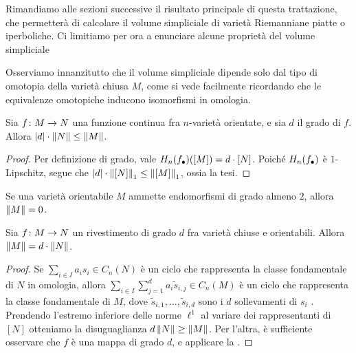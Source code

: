 Rimandiamo alle sezioni successive il risultato principale di questa trattazione, che permetterà di calcolare il volume simpliciale di varietà Riemanniane piatte o iperboliche. Ci limitiamo per ora a enunciare alcune proprietà del volume simpliciale

Osserviamo innanzitutto che il volume simpliciale dipende solo dal tipo di omotopia della varietà chiusa $M$, come si vede facilmente ricordando che le equivalenze omotopiche inducono isomorfismi in omologia.

\begin{proposition}
Sia $\map{f}{M}{N}$ una funzione continua fra $n$-varietà orientate, e sia $d$ il grado di $f$. Allora $|d|\cdot\left\lVert N\right\rVert\le\left\lVert M\right\rVert$.
\end{proposition}
\begin{proof}
Per definizione di grado, vale $H_n(f_\bullet)([M])=d\cdot[N]$. Poiché $H_n(f_\bullet)$ è $1$-Lipschitz, segue che $|d|\cdot\left\lVert [N]\right\rVert_1\le\left\lVert [M]\right\rVert_1$, ossia la tesi.
\end{proof}

\begin{corollary}
Se una varietà orientabile $M$ ammette endomorfismi di grado almeno $2$, allora $\left\lVert M\right\rVert=0$.
\end{corollary}

\begin{proposition}
Sia $\map{f}{M}{N}$ un rivestimento di grado $d$ fra varietà chiuse e orientabili. Allora $\left\lVert M\right\rVert=d\cdot\left\lVert N\right\rVert$. 
\end{proposition}
\begin{proof}
Se $\sum_{i\in I}a_is_i\in C_n(N)$ è un ciclo che rappresenta la classe fondamentale di $N$ in omologia, allora $\sum_{i\in I}\sum_{j=1}^da_i\widetilde{s}_{i,j}\in C_n(M)$ è un ciclo che rappresenta la classe fondamentale di $M$, dove $\widetilde{s}_{i,1},\ldots,\widetilde{s}_{i,d}$ sono i $d$ sollevamenti di $s_i$ . Prendendo l'estremo inferiore delle norme $\ell^1$ al variare dei rappresentanti di $[N]$ otteniamo la disuguaglianza $d\left\lVert N\right\rVert\ge\left\lVert M\right\rVert$. Per l'altra, è sufficiente osservare che $f$ è una mappa di grado $d$, e applicare la .
\end{proof}

